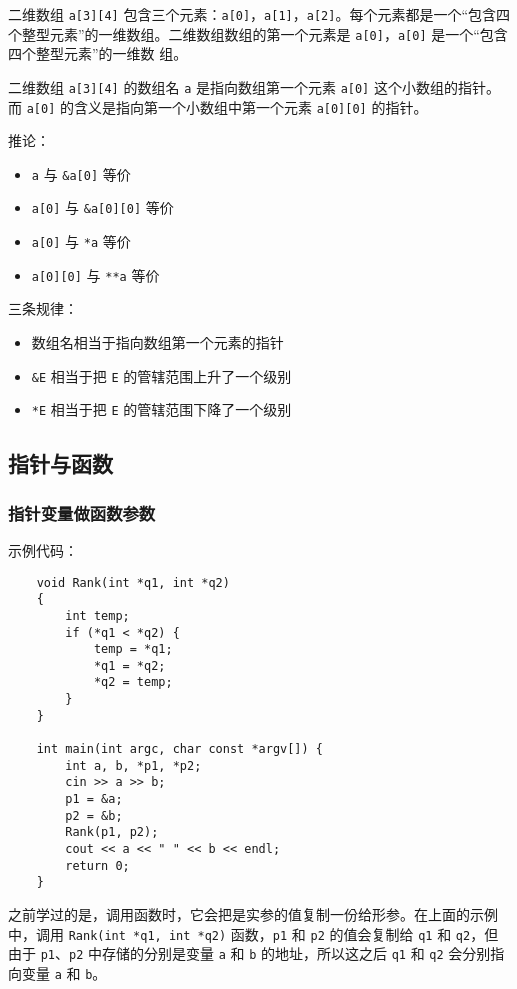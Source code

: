 \documentclass[UTF8]{ctexart}
\begin{document}
二维数组 \texttt{a[3][4]} 包含三个元素：\texttt{a[0]}，\texttt{a[1]}，\texttt{a[2]}。每个元素都是一个“包含四
个整型元素”的一维数组。二维数组数组的第一个元素是 \texttt{a[0]}，\texttt{a[0]} 是一个“包含四个整型元素”的一维数
组。

二维数组 \texttt{a[3][4]} 的数组名 \texttt{a} 是指向数组第一个元素 \texttt{a[0]} 这个小数组的指针。而
\texttt{a[0]} 的含义是指向第一个小数组中第一个元素 \texttt{a[0][0]} 的指针。

推论：
\begin{itemize}
    \item \texttt{a} 与 \texttt{\&a[0]} 等价
    \item \texttt{a[0]} 与 \texttt{\&a[0][0]} 等价
    \item \texttt{a[0]} 与 \texttt{*a} 等价
    \item \texttt{a[0][0]} 与 \texttt{**a} 等价
\end{itemize}

三条规律：
\begin{itemize}
    \item 数组名相当于指向数组第一个元素的指针
    \item \texttt{\&E} 相当于把 \texttt{E} 的管辖范围上升了一个级别
    \item \texttt{*E} 相当于把 \texttt{E} 的管辖范围下降了一个级别
\end{itemize}

\subsection{指针与函数}
\subsubsection{指针变量做函数参数}
示例代码：
\begin{verbatim}
    void Rank(int *q1, int *q2)
    {
        int temp;
        if (*q1 < *q2) {
            temp = *q1;
            *q1 = *q2;
            *q2 = temp;
        }
    }

    int main(int argc, char const *argv[]) {
        int a, b, *p1, *p2;
        cin >> a >> b;
        p1 = &a;
        p2 = &b;
        Rank(p1, p2);
        cout << a << " " << b << endl;
        return 0;
    }
\end{verbatim}

之前学过的是，调用函数时，它会把是实参的值复制一份给形参。在上面的示例中，调用 \linebreak[6]
\texttt{Rank(int *q1, int *q2)} 函数，\texttt{p1} 和 \texttt{p2} 的值会复制给 \texttt{q1} 和
\texttt{q2}，但由于 \texttt{p1}、\texttt{p2} 中存储的分别是变量 \texttt{a} 和 \texttt{b} 的地址，所以这之后
\texttt{q1} 和 \texttt{q2} 会分别指向变量 \texttt{a} 和 \texttt{b}。
\end{document}
